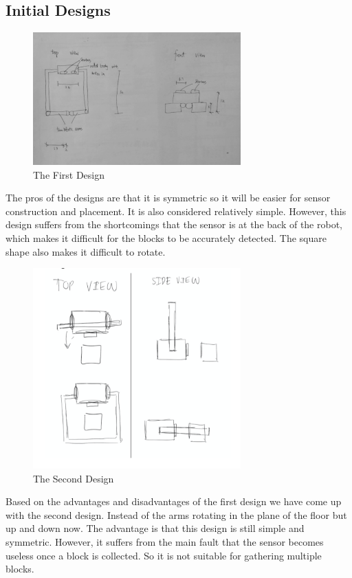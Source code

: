 \subsection{Initial Designs}

\begin{figure}[H]
    \centering
    \includegraphics[width=8cm]{Design1}
    \caption{The First Design}
    \label{}
\end{figure}


The pros of the designs are that it is symmetric so it will be easier for sensor construction and placement. It is also considered relatively simple. However, this design suffers from the shortcomings that the sensor is at the back of the robot, which makes it difficult for the blocks to be accurately detected. The square shape also makes it difficult to rotate. 


\begin{figure}[H]
    \centering
    \includegraphics[width=8cm]{Design2}
    \caption{The Second Design}
    \label{}
\end{figure}


Based on the advantages and disadvantages of the first design we have come up with the second design. Instead of the arms rotating in the plane of the floor but up and down now. The advantage is that this design is still simple and symmetric. However, it suffers from the main fault that the sensor becomes useless once a block is collected. So it is not suitable for gathering multiple blocks.

